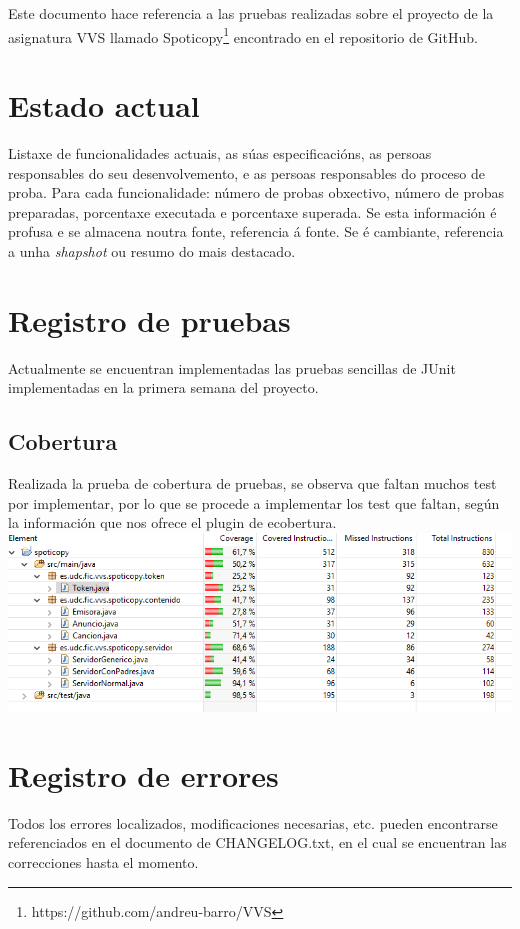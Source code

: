 \documentclass[12pt, a4paper, titlepage]{article}
\begin{document}
Este documento hace referencia a las pruebas realizadas sobre el proyecto de la asignatura VVS llamado Spoticopy\footnote{https://github.com/andreu-barro/VVS} encontrado en el repositorio de GitHub.

\section{Estado actual}

Listaxe de funcionalidades actuais, as súas especificacións, as persoas responsables do seu desenvolvemento, e as persoas responsables do proceso de proba.  Para cada funcionalidade: número de probas obxectivo, número de probas preparadas, porcentaxe executada e porcentaxe superada. Se esta información é profusa e se almacena noutra fonte, referencia á fonte. Se é cambiante, referencia a unha \emph{shapshot} ou resumo do mais destacado.

\section{Registro de pruebas}
Actualmente se encuentran implementadas las pruebas sencillas de JUnit implementadas en la primera semana del proyecto.
\subsection{Cobertura}
Realizada la prueba de cobertura de pruebas, se observa que faltan muchos test por implementar, por lo que se procede a implementar los test que faltan, según la información que nos ofrece el plugin de ecobertura.\\
\includegraphics[width=15cm]{Imagenes/CoberturaSemana1.png} \\



\section{Registro de errores}

Todos los errores localizados, modificaciones necesarias, etc. pueden encontrarse referenciados en el documento de CHANGELOG.txt, en el cual se encuentran las correcciones hasta el momento.
\end{document}
